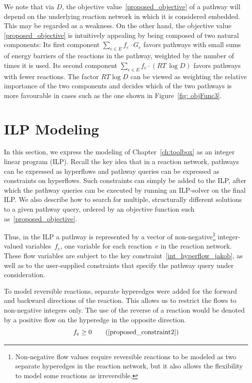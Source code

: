 We note that via $D$, the objective value~\eqref{proposed_objective} of a pathway will depend on the underlying reaction network in which it is considered embedded. This may be regarded as a weakness. On the other hand, the objective value \eqref{proposed_objective} is intuitively appealing by being composed of two natural components: Its first component $\sum_{e \in E} f_e\cdot G_e$ favors pathways with small sums of energy barriers of the reactions in the pathway, weighted by the number of times it is used. Its second component $\sum_{e \in E} f_e \cdot \left( RT \, \log D\right)$ favors pathways with fewer reactions. The factor $ RT \log D$ can be viewed as weighting the relative importance of the two components and decides which of the two pathways is more favourable in cases such as the one shown in Figure~\ref{fig: objFunc3}.

\section{ILP Modeling} \label{implemented_model}

In this section, we express the modeling of Chapter~\ref{ch:toolbox} as an integer linear program (ILP). Recall the key idea that in a reaction network, pathways can be expressed as hyperflows and pathway queries can be expressed as constraints on hyperflows. Such constraints can simply be added to the ILP, after which the pathway queries can be executed by running an ILP-solver on the final ILP. We also describe how to search for multiple, structurally different solutions to a given pathway query, ordered by an objective function such as~\eqref{proposed_objective}.

Thus, in the ILP a pathway is represented by a vector of non-negative\footnote{Non-negative flow values require reversible reactions to be modeled as two separate hyperedges in the reaction network, but it also allows the flexibility to model some reactions as irreversible.} integer-valued variables~$f_e$, one variable for each reaction~$e$ in the reaction network. These flow variables are subject to the key constraint~\eqref{int_hyperflow_jakob}, as well as to the user-supplied constraints that specify the pathway query under consideration.

To model reversible reactions, separate hyperedges were added for the forward and backward directions of the reaction. This allows us to restrict the flows to non-negative integers only. The use of the reverse of a reaction would be denoted by a positive flow on the hyperedge in the opposite direction.
\begin{equation}
    f_e \geq 0 \tag{\ref{proposed_constraint2}}
\end{equation}

